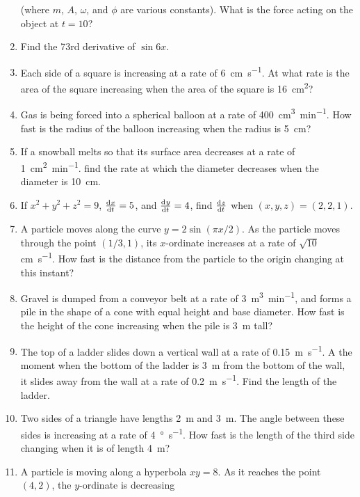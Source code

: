 \begin{enumerate}
        (where $ m $, $ A $, $ \omega $, and $ \phi $ are various constants). What is the force acting on the object at $ t = 10 $?
  \item Find the 73rd derivative of $ \sin 6x $.
  \item Each side of a square is increasing at a rate of \SI{6}{\centi\metre\per\second}. At what rate is the
        area of the square increasing when the area of the square is \SI{16}{\centi\metre\squared}?
  \item Gas is being forced into a spherical balloon at a rate of \SI{400}{\centi\metre\cubed\per\minute}. How fast
        is the radius of the balloon increasing when the radius is \SI{5}{\centi\metre}?
  \item If a snowball melts so that its surface area decreases at a rate of \SI{1}{\centi\metre\squared\per\minute}.
        find the rate at which the diameter decreases when the diameter is \SI{10}{\centi\metre}.
  \item If $ x^2 + y^2 + z^2 = 9 $, $ \od{x}{t} = 5 $, and $ \od{y}{t} = 4 $, find $ \od{z}{t} $ when $ (x,y,z) = (2,2,1) $.
  \item A particle moves along the curve $ y = 2\sin(\pi x/2) $. As the particle moves through the point $ (1/3, 1) $,
        its $ x$-ordinate increases at a rate of $ \sqrt{10} $ \si{\centi\metre\per\second}. How fast is the distance
        from the particle to the origin changing at this instant?
  \item Gravel is dumped from a conveyor belt at a rate of \SI{3}{\metre\cubed\per\minute}, and forms a pile in the shape
        of a cone with equal height and base diameter. How fast is the height of the cone increasing when the pile is \SI{3}{\metre}
        tall?
  \item The top of a ladder slides down a vertical wall at a rate of \SI{0.15}{\metre\per\second}. A the moment when the bottom
        of the ladder is \SI{3}{\metre} from the bottom of the wall, it slides away from the wall at a rate of \SI{0.2}{\metre\per\second}.
        Find the length of the ladder.
  \item Two sides of a triangle have lengths \SI{2}{\metre} and \SI{3}{\metre}. The angle between these sides is increasing
        at a rate of \SI{4}{\degree\per\second}. How fast is the length of the third side changing when it is of length \SI{4}{\metre}?
  \item A particle is moving along a hyperbola $ xy = 8 $. As it reaches the point $ (4, 2) $, the $ y$-ordinate is decreasing

\end{enumerate}
